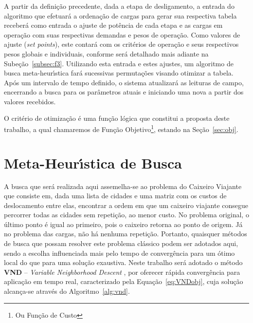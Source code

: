 A partir da defini{\c c}{\~a}o precedente, dada a etapa de desligamento, a entrada do algoritmo que efetuar{\'a} a ordena{\c c}{\~a}o de cargas para gerar sua respectiva tabela receber{\'a} como entrada o ajuste de pot{\^e}ncia de cada etapa e as cargas em opera{\c c}{\~a}o com suas respectivas demandas e pesos de opera{\c c}{\~a}o. Como valores de ajuste (\textit{set points}), este contar{\'a} com os crit{\'e}rios de opera{\c c}{\~a}o e seus respectivos pesos globais e individuais, conforme ser{\'a} detalhado mais adiante na Sube{\c c}{\~a}o~\ref{subsec:f3}. Utilizando esta entrada e estes ajustes, um algoritmo de busca meta-heur{\'\i}stica far{\'a} sucessivas permuta{\c c}{\~o}es visando otimizar a tabela. Ap{\'o}s um intervalo de tempo definido, o sistema atualizar{\'a} as leituras de campo, encerrando a busca para os par{\^a}metros atuais e iniciando uma nova a partir dos valores recebidos.

O crit{\'e}rio de otimiza{\c c}{\~a}o {\'e} uma fun{\c c}{\~a}o l{\'o}gica que constitui a proposta deste trabalho, a qual chamaremos de Fun{\c c}{\~a}o Objetivo\footnote{Ou Fun{\c c}{\~a}o de Custo}, estando na Se{\c c}{\~a}o~\ref{sec:obj}.

\section{Meta-Heur{\'\i}stica de Busca} \label{sec:meth}

A busca que ser{\'a} realizada aqui assemelha-se ao problema do Caixeiro Viajante \cite{applegate2006traveling} que consiste em, dada uma lista de cidades e uma matriz com os custos de deslocamento entre elas, encontrar a ordem em que um caixeiro viajante consegue percorrer todas as cidades sem repeti{\c c}{\~a}o, ao menor custo. No problema original, o {\'u}ltimo ponto {\'e} igual ao primeiro, pois o caixeiro retorna ao ponto de origem. J{\'a} no problema das cargas, n{\~a}o h{\'a} nenhuma repeti{\c c}{\~a}o. Portanto, quaisquer m{\'e}todos de busca que possam resolver este problema cl{\'a}ssico podem ser adotados aqui, sendo a escolha influenciada mais pelo tempo de converg{\^e}ncia para um {\'o}timo local do que para uma solu{\c c}{\~a}o exaustiva. Neste trabalho ser{\'a} adotado o m{\'e}todo \textbf{VND} \--- \textit{Variable Neighborhood Descent} \cite{hansen2001449,hansen2019}, por oferecer r{\'a}pida converg{\^e}ncia para aplica{\c c}{\~a}o em tempo real, caracterizado pela Equa{\c c}{\~a}o~\ref{eq:VNDobj}, cuja solu{\c c}{\~a}o alcan{\c c}a-se atrav{\'e}s do Algoritmo~\ref{alg:vnd}.

